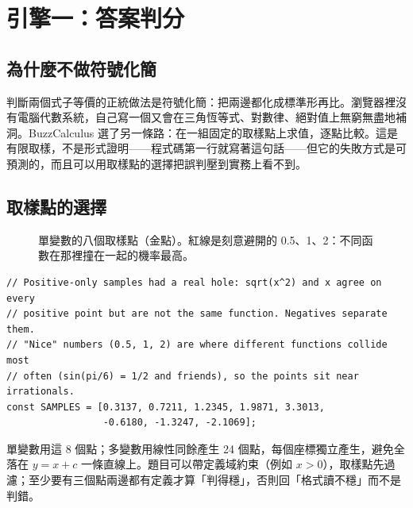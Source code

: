 \documentclass[11pt,a4paper,oneside]{report}
\renewcommand{\_}{\ifmmode\origunderscore\else\textunderscore\allowbreak\fi}
\begin{document}
\chapter{引擎一：答案判分}
\section{為什麼不做符號化簡}
判斷兩個式子等價的正統做法是符號化簡：把兩邊都化成標準形再比。瀏覽器裡沒有電腦代數系統，自己寫一個又會在三角恆等式、對數律、絕對值上無窮無盡地補洞。BuzzCalculus 選了另一條路：在一組固定的取樣點上求值，逐點比較。這是有限取樣，不是形式證明——程式碼第一行就寫著這句話——但它的失敗方式是可預測的，而且可以用取樣點的選擇把誤判壓到實務上看不到。

\section{取樣點的選擇}
\begin{figure}[h]
\centering
{}
\caption{單變數的八個取樣點（金點）。紅線是刻意避開的 0.5、1、2：不同函數在那裡撞在一起的機率最高。}
\end{figure}

\begin{lstlisting}
// Positive-only samples had a real hole: sqrt(x^2) and x agree on every
// positive point but are not the same function. Negatives separate them.
// "Nice" numbers (0.5, 1, 2) are where different functions collide most
// often (sin(pi/6) = 1/2 and friends), so the points sit near irrationals.
const SAMPLES = [0.3137, 0.7211, 1.2345, 1.9871, 3.3013,
                 -0.6180, -1.3247, -2.1069];
\end{lstlisting}
單變數用這 8 個點；多變數用線性同餘產生 24 個點，每個座標獨立產生，避免全落在 $y = x + c$ 一條直線上。題目可以帶定義域約束（例如 $x > 0$），取樣點先過濾；至少要有三個點兩邊都有定義才算「判得穩」，否則回「格式讀不穩」而不是判錯。
\end{document}
